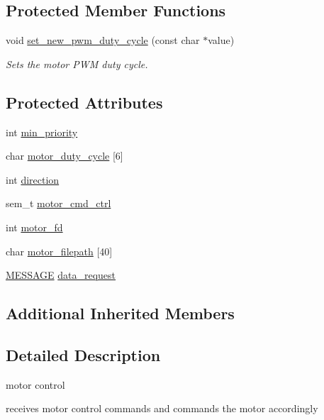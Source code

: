 \subsection*{Protected Member Functions}
\begin{DoxyCompactItemize}
\item 
void \hyperlink{classMotor_af6301006bc0b18d6a4b32d2be0cd93a7}{set\-\_\-new\-\_\-pwm\-\_\-duty\-\_\-cycle} (const char $\ast$value)
\begin{DoxyCompactList}\small\item\em Sets the motor P\-W\-M duty cycle. \end{DoxyCompactList}\end{DoxyCompactItemize}
\subsection*{Protected Attributes}
\begin{DoxyCompactItemize}
\item 
int \hyperlink{classMotor_a0125717053068acb08b430d820bfc413}{min\-\_\-priority}
\item 
char \hyperlink{classMotor_a158ba3b940abdc85c7c1e4b1bf651a6e}{motor\-\_\-duty\-\_\-cycle} \mbox{[}6\mbox{]}
\item 
int \hyperlink{classMotor_a7d7c98b5afa45656905708e54ff7fb9a}{direction}
\item 
sem\-\_\-t \hyperlink{classMotor_a827a1d2b453a804d389cdafbf0685022}{motor\-\_\-cmd\-\_\-ctrl}
\item 
int \hyperlink{classMotor_acb2ac1bd2630b05c40a64154a87ea65d}{motor\-\_\-fd}
\item 
char \hyperlink{classMotor_aed42ebef60a1374fc86dd2aff59af85e}{motor\-\_\-filepath} \mbox{[}40\mbox{]}
\item 
\hyperlink{SUBSYS__COMMANDS_8h_ad814416fc1a8c675bea2687d96088a8f}{M\-E\-S\-S\-A\-G\-E} \hyperlink{classMotor_ab2774f3d9c41683a683f10ef20a29607}{data\-\_\-request}
\end{DoxyCompactItemize}
\subsection*{Additional Inherited Members}


\subsection{Detailed Description}
motor control 

receives motor control commands and commands the motor accordingly 

